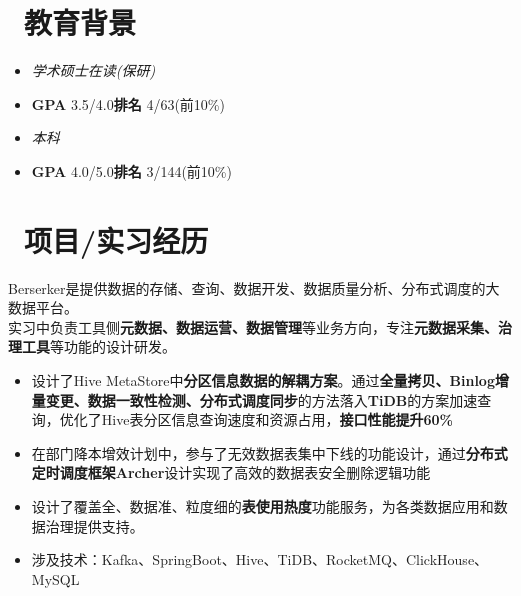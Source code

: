 \documentclass{resume}
\begin{document}


  \section{\faGraduationCap\ 教育背景}
  \begin{itemize}
    \item \textit{学术硕士在读(保研)}
    \item \textbf{GPA} 3.5/4.0\space \space \textbf{排名} 4/63(前10\%)
  \end{itemize}
  \begin{itemize}
    \item \textit{本科}
    \item \textbf{GPA} 4.0/5.0\space \space \textbf{排名} 3/144(前10\%)
  \end{itemize}

\section{\faUsers\ 项目/实习经历}
Berserker是提供数据的存储、查询、数据开发、数据质量分析、分布式调度的大数据平台。\\
实习中负责工具侧\textbf{元数据、数据运营、数据管理}等业务方向，专注\textbf{元数据采集、治理工具}等功能的设计研发。
\begin{itemize}
  \item 设计了Hive MetaStore中\textbf{分区信息数据的解耦方案}。通过\textbf{全量拷贝、Binlog增量变更、数据一致性检测、分布式调度同步}的方法落入\textbf{TiDB}的方案加速查询，优化了Hive表分区信息查询速度和资源占用，\textbf{接口性能提升60\%}
  \item 在部门降本增效计划中，参与了无效数据表集中下线的功能设计，通过\textbf{分布式定时调度框架Archer}设计实现了高效的数据表安全删除逻辑功能
  \item 设计了覆盖全、数据准、粒度细的\textbf{表使用热度}功能服务，为各类数据应用和数据治理提供支持。
  \item 涉及技术：Kafka、SpringBoot、Hive、TiDB、RocketMQ、ClickHouse、MySQL
\end{itemize}
\end{document}
